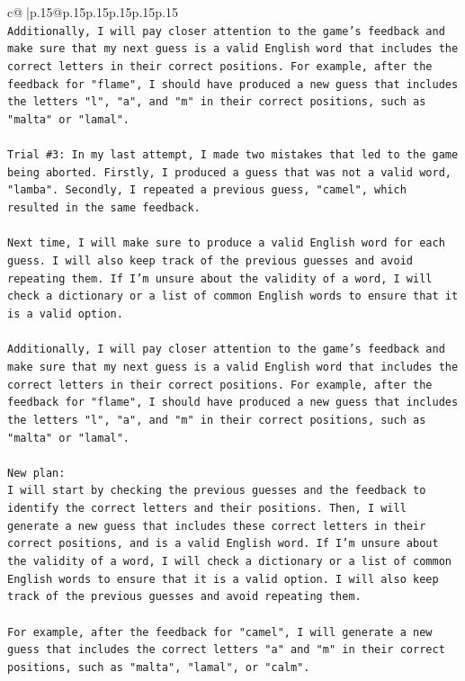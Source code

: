 \documentclass{article}
\begin{document}
{\begin{supertabular}{c@{$\;$}|p{.15\linewidth}@{}p{.15\linewidth}p{.15\linewidth}p{.15\linewidth}p{.15\linewidth}p{.15\linewidth}}
{{{\\ 
\texttt{Additionally, I will pay closer attention to the game's feedback and make sure that my next guess is a valid English word that includes the correct letters in their correct positions. For example, after the feedback for "flame", I should have produced a new guess that includes the letters "l", "a", and "m" in their correct positions, such as "malta" or "lamal".} \\
\\ 
\texttt{Trial \#3: In my last attempt, I made two mistakes that led to the game being aborted. Firstly, I produced a guess that was not a valid word, "lamba". Secondly, I repeated a previous guess, "camel", which resulted in the same feedback. } \\
\\ 
\texttt{Next time, I will make sure to produce a valid English word for each guess. I will also keep track of the previous guesses and avoid repeating them. If I'm unsure about the validity of a word, I will check a dictionary or a list of common English words to ensure that it is a valid option.} \\
\\ 
\texttt{Additionally, I will pay closer attention to the game's feedback and make sure that my next guess is a valid English word that includes the correct letters in their correct positions. For example, after the feedback for "flame", I should have produced a new guess that includes the letters "l", "a", and "m" in their correct positions, such as "malta" or "lamal".} \\
\\ 
\texttt{New plan: } \\
\texttt{I will start by checking the previous guesses and the feedback to identify the correct letters and their positions. Then, I will generate a new guess that includes these correct letters in their correct positions, and is a valid English word. If I'm unsure about the validity of a word, I will check a dictionary or a list of common English words to ensure that it is a valid option. I will also keep track of the previous guesses and avoid repeating them. } \\
\\ 
\texttt{For example, after the feedback for "camel", I will generate a new guess that includes the correct letters "a" and "m" in their correct positions, such as "malta", "lamal", or "calm".} \\
\\ 
\\ 
}}}
\end{supertabular}}
\end{document}
